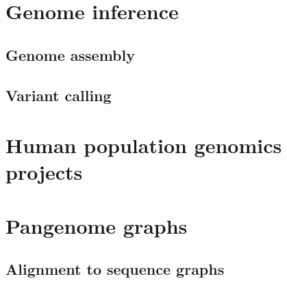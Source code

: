 \documentclass[11pt]{ucthesis}
\begin{document}
\section{Genome inference}

\subsection{Genome assembly}

\subsection{Variant calling}

\section{Human population genomics projects}

\section{Pangenome graphs}

\subsection{Alignment to sequence graphs}

\subsection{}



\end{document}
